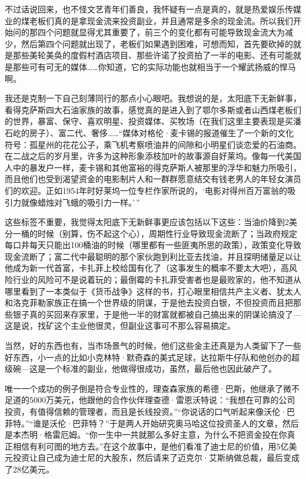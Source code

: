 不过话说回来，也不怪文艺青年们善良，我怀疑有一点是真的，就是热爱娱乐传媒业的煤老板们真的是拿现金流来投资副业，并且通常是多余的现金流。所以我们开始问的那四个问题就显得尤其重要了，前三个的变化都有可能导致现金流大为减少，然后第四个问题就出现了，老板们如果遇到困难，可想而知，首先要砍掉的就是那些美轮美奂的度假村酒店项目、那些许诺了投资拍了一半的电影、还有可能就是那些可有可无的媒体\ldots{}\ldots{}你知道，它的实际功能也就相当于一个耀武扬威的悍马啊。

我还是克制一下自己刻薄同行的那点小心眼吧。我想说的是，太阳底下无新鲜事，看得克萨斯四大石油家族的故事，感觉真的是进入到了鄂尔多斯或者山西煤老板们的世界，暴富、保守、喜欢明星、投资媒体、买牧场（在我们这里主要表现是买潘石屹的房子）、富二代、奢侈\ldots{}\ldots{}``媒体对格伦·麦卡锡的报道催生了一个新的文化符号：孤星州的花花公子，乘飞机考察喷油井的间隙和小明星们谈恋爱的石油商。在二战之后的岁月里，许多为这种形象添枝加叶的故事源自好莱坞。像每一代美国人中的暴发户一样，麦卡锡和其他富裕的得克萨斯人被那里的浮华和魅力所吸引，而且他们也受到渴望资金的电影制片人和一群群愿意结交有钱老男人的年轻女演员们的欢迎。正如1954年时好莱坞一位专栏作家所说的，`电影对得州百万富翁的吸引力就像蜡烛对飞蛾的吸引力一样。'\,''

这些标签不重要，我觉得太阳底下无新鲜事更应该包括以下这些：当油价降到2美分一桶的时候（别算，伤不起这个心），周期性行业导致现金流断了；当政府规定每口井每天只能出100桶油的时候（哪里都有一些匪夷所思的政策），政策变化导致现金流断了；富二代中最聪明的那个家伙跑到利比亚去找油，并且探明储量足以让他成为新一代首富，卡扎菲上校给国有化了（这事发生的概率不要太大吧），高风险行业的风险可不是说着玩的；最倒霉的卡扎菲受害者也是最败家的，他不知道从哪里看到了一本类似于《货币战争》这样的书，打心眼里相信共产主义者、犹太人和洛克菲勒家族正在搞一个世界级的阴谋，于是他去投资白银，不但投资而且把那些银子真的买回来存家里，于是他一半的财富就都被自己搞出来的阴谋论搞没了---这是说，找矿这个主业他很灵，但副业这事可不那么容易搞定。

当然，好的东西也有，当市场景气的时候，他们这些金主还真是为人类留下了一些好东西，小一点的比如小克林特·默奇森的美式足球，达拉斯牛仔队和他创办的超级碗---这是一个标准的副业，他做得很成功，虽然，最后他也因此破产了。

唯一一个成功的例子倒是符合专业性的，理查森家族的希德·巴斯，他继承了微不足道的5000万美元，他跟他的合作伙伴理查德·雷恩沃特说：``我想在可靠的公司投资，有值得信赖的管理者，而且是长线投资。''``你说话的口气听起来像沃伦·巴菲特。''``谁是沃伦·巴菲特？''于是两人开始研究奥马哈这位投资圣人的文章，然后是本杰明·格雷厄姆。``你一生中一共就那么多好主意，为什么不把资金投在你真正相信有利可图的地方去。''在这个故事中，是他们看准了迪士尼的价值，用5亿美元投资让自己成为迪士尼的大股东，然后请来了迈克尔·艾斯纳做总裁，最后变成了28亿美元。

